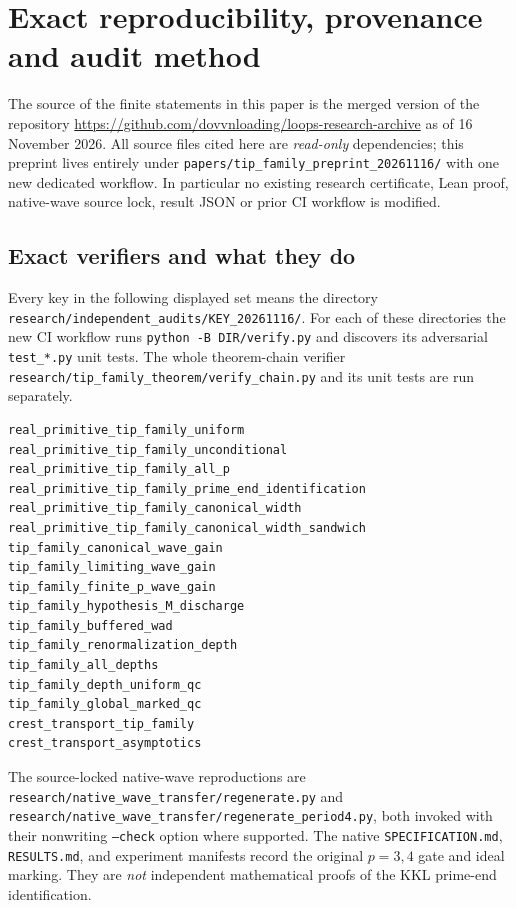 \section{Exact reproducibility, provenance and audit method}
\label{sec:reproduce}
The source of the finite statements in this
paper is the merged version of the repository
\url{https://github.com/dovvnloading/loops-research-archive}
as of 16 November 2026.
All source files cited here are \emph{read-only}
dependencies; this preprint lives entirely
under \texttt{papers/tip\_family\_preprint\_20261116/}
with one new dedicated workflow.
In particular no existing research
certificate, Lean proof, native-wave
source lock, result JSON or prior
CI workflow is modified.

\subsection{Exact verifiers and what they do}
Every key in the following displayed set
means the directory
\texttt{research/independent\_audits/KEY\_20261116/}.
For each of these directories the
new CI workflow runs
\texttt{python -B DIR/verify.py}
and discovers its adversarial
\texttt{test\_*.py} unit tests.
The whole theorem-chain verifier
\texttt{research/tip\_family\_theorem/verify\_chain.py}
and its unit tests are run separately.
\begingroup\fontsize{7}{8.5}\selectfont
\begin{verbatim}
real_primitive_tip_family_uniform
real_primitive_tip_family_unconditional
real_primitive_tip_family_all_p
real_primitive_tip_family_prime_end_identification
real_primitive_tip_family_canonical_width
real_primitive_tip_family_canonical_width_sandwich
tip_family_canonical_wave_gain
tip_family_limiting_wave_gain
tip_family_finite_p_wave_gain
tip_family_hypothesis_M_discharge
tip_family_buffered_wad
tip_family_renormalization_depth
tip_family_all_depths
tip_family_depth_uniform_qc
tip_family_global_marked_qc
crest_transport_tip_family
crest_transport_asymptotics
\end{verbatim}
\endgroup
The source-locked native-wave
reproductions are
\texttt{research/native\_wave\_transfer/regenerate.py}
and
\texttt{research/native\_wave\_transfer/regenerate\_period4.py},
both invoked with their
nonwriting \texttt{--check} option
where supported.  The
native \texttt{SPECIFICATION.md},
\texttt{RESULTS.md},
and experiment manifests
record the original
$p=3,4$ gate and
ideal marking.  They
are \emph{not} independent
mathematical proofs of
the KKL prime-end
identification.

